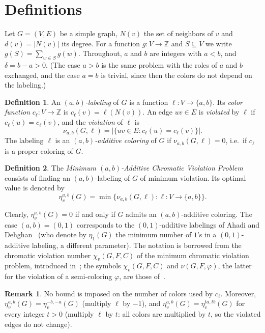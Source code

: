 \documentclass[a4paper,11pt]{article}
\newcommand{\ie}{{i.e.~}}
\newcommand{\Z}{\mathbb{Z}}
\newcommand{\etav}{\eta_v^{a,b}}
\theoremstyle{definition}
\newtheorem{defn}{Definition}
\newtheorem{rem}{Remark}
\begin{document}
\section{Definitions}

Let $G = (V,E)$ be a simple graph, $N(v)$ the set of neighbors of $v$ and $d(v) = |N(v)|$ its degree.
For a function $g : V \to \Z$ and $S \subseteq V$ we write $g(S) = \sum_{w \in S} g(w)$.
Throughout, $a$ and $b$ are integers with $a < b$, and $\delta = b - a > 0$. (The case $a > b$ is the same problem with
the roles of $a$ and $b$ exchanged, and the case $a = b$ is trivial, since then the colors do not depend on the labeling.)

\begin{defn}
An \emph{$(a,b)$-labeling} of $G$ is a function $\ell : V \to \{a, b\}$. Its \emph{color function}
$c_\ell : V \to \Z$ is $c_\ell(v) = \ell(N(v))$. An edge $uv \in E$ is \emph{violated} by $\ell$ if
$c_\ell(u) = c_\ell(v)$, and the \emph{violation} of $\ell$ is
$$\nu_{a,b}(G, \ell) = |\{ uv \in E : c_\ell(u) = c_\ell(v) \}|.$$
The labeling $\ell$ is an \emph{$(a,b)$-additive coloring} of $G$ if $\nu_{a,b}(G,\ell) = 0$, \ie if $c_\ell$
is a proper coloring of $G$.
\end{defn}

\begin{defn}
The \emph{Minimum $(a,b)$-Additive Chromatic Violation Problem} consists of finding an $(a,b)$-labeling of $G$
of minimum violation. Its optimal value is denoted by
$$\etav(G) = \min \{ \nu_{a,b}(G, \ell) : \ell : V \to \{a,b\} \}.$$
\end{defn}

Clearly, $\etav(G) = 0$ if and only if $G$ admits an $(a,b)$-additive coloring. The case $(a,b) = (0,1)$ corresponds to
the $(0,1)$-additive labelings of Ahadi and Dehghan~\cite{AD16} (who denote by $\eta_1(G)$ the minimum number of
$1$'s in a $(0,1)$-additive labeling, a different parameter). The notation is borrowed from the chromatic violation number
$\chi_v(G,F,C)$ of the minimum chromatic violation problem, introduced in~\cite{BDEMUV20}; the symbols $\chi_v(G,F,C)$
and $\nu(G,F,\varphi)$, the latter for the violation of a semi-coloring $\varphi$, are those of~\cite{UDE23}.

\begin{rem} \label{RSCALE}
No bound is imposed on the number of colors used by $c_\ell$.
Moreover, $\eta_v^{a,b}(G) = \eta_v^{-b,-a}(G)$ (multiply $\ell$ by $-1$), and $\eta_v^{a,b}(G) = \eta_v^{ta,tb}(G)$ for every integer $t > 0$
(multiply $\ell$ by $t$: all colors are multiplied by $t$, so the violated edges do not change).
\end{rem}
\end{document}
